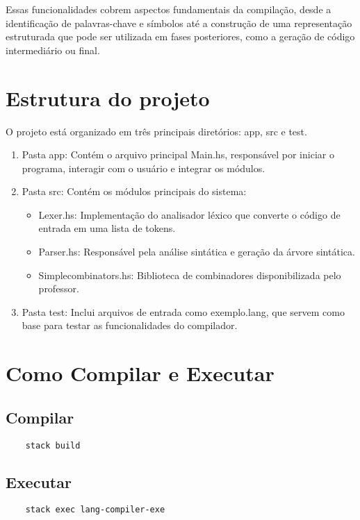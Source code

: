 \documentclass{article}
\begin{document}
Essas funcionalidades cobrem aspectos fundamentais da compilação, desde a identificação de palavras-chave e símbolos até a construção de uma representação estruturada que pode ser utilizada em fases posteriores, como a geração de código intermediário ou final.

\section{Estrutura do projeto}

O projeto está organizado em três principais diretórios: app, src e test.
\begin{enumerate}
    \item Pasta app: Contém o arquivo principal Main.hs, responsável por iniciar o programa, interagir com o usuário e integrar os módulos. 
    \item Pasta src: Contém os módulos principais do sistema:
        \begin{itemize}
            \item Lexer.hs: Implementação do analisador léxico que converte o código de entrada em uma lista de tokens. 
            \item Parser.hs: Responsável pela análise sintática e geração da árvore sintática.
            \item Simplecombinators.hs: Biblioteca de combinadores disponibilizada pelo professor.
        \end{itemize}

    \item Pasta test: Inclui arquivos de entrada como exemplo.lang, que servem como base para testar as funcionalidades do compilador. 
\end{enumerate}

\newpage
\section{Como Compilar e Executar}
\subsection{Compilar}
\begin{verbatim}
    stack build
\end{verbatim}

\subsection{Executar}
\begin{verbatim}
    stack exec lang-compiler-exe
\end{verbatim}
\end{document}
